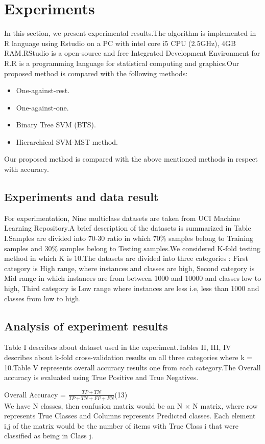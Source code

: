 \documentclass[a4paper, 10pt, conference]{ieeeconf}      %
\begin{document}
\section{Experiments}

In this section, we present experimental results.The algorithm is implemented in
R language using Rstudio on a PC with intel core i5 CPU (2.5GHz), 4GB RAM.RStudio is a open-source and free Integrated Development Environment for R.R is a programming language for statistical computing and graphics.Our proposed method is compared with the following methods:
\begin{itemize}
\item One-against-rest.
\item One-against-one.
\item Binary Tree SVM (BTS).
\item Hierarchical SVM-MST method.
\end{itemize}
Our proposed method is compared with the above mentioned methods in respect with accuracy.

\subsection{Experiments and data result}
For experimentation, Nine multiclass datasets are taken from UCI Machine Learning Repository.A brief description of the datasets is summarized in Table I.Samples are divided into 70-30 ratio in which 70\% samples belong to Training samples and 30\% samples belong to Testing samples.We considered K-fold testing method in which K is 10.The datasets are divided into three categories : First category is High range, where instances and classes are high, Second category is Mid range in which instances are from between 1000 and 10000 and classes low to high, Third category is Low range where instances are less i.e, less than 1000 and classes from low to high.

\subsection{Analysis of experiment results}
Table I describes about dataset used in the experiment.Tables II, III, IV describes about k-fold cross-validation results on all three categories where k = 10.Table V represents overall accuracy results one from each category.The Overall accuracy is evaluated using True Positive and True Negatives.\\
\par Overall Accuracy = $\frac{TP + TN}{TP + TN +FP + FN}$\hspace{2cm}(13) \\
\newline
We have N classes, then confusion matrix would be an N × N matrix, where row represents True Classes and Columns represents Predicted classes. Each element {i,j} of the matrix would be the number of items with True Class i that were classified as being in Class j.
\par
\end{document}
